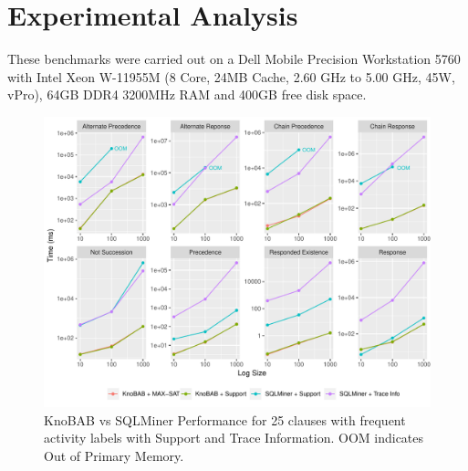 
\section{Experimental Analysis}\label{sec:exp}
These benchmarks were carried out on a Dell Mobile Precision Workstation 5760 with 
Intel Xeon W-11955M (8 Core, 24MB Cache, 2.60 GHz to 5.00 GHz, 45W, vPro), 64GB DDR4 3200MHz RAM and 400GB free disk space.
\begin{figure}[!t]
	\centering
	\includegraphics[width=.8\textwidth]{images/sqlminer_benchmark.pdf}
	\caption{KnoBAB vs SQLMiner Performance for 25  clauses with frequent activity labels with Support and Trace Information. OOM indicates Out of Primary Memory.}\label{fig:vsSQL}
\end{figure}



